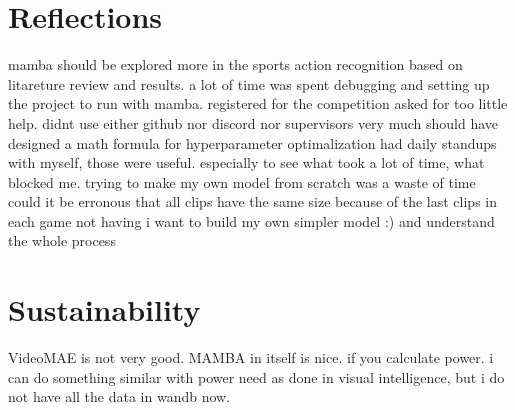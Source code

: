 \section{Reflections}
mamba should be explored more in the sports action recognition based on litareture review and results. 
a lot of time was spent debugging and setting up the project to run with mamba. 
registered for the competition
asked for too little help. didnt use either github nor discord nor supervisors very much
should have designed a math formula for hyperparameter optimalization
had daily standups with myself, those were useful. especially to see what took a lot of time, what blocked me.
trying to make my own model from scratch was a waste of time
could it be erronous that all clips have the same size because of the last clips in each game not having
i want to build my own simpler model :) and understand the whole process

\section{Sustainability}
VideoMAE is not very good. MAMBA in itself is nice. if you calculate power. i can do something similar with power need as done in visual intelligence, but i do not have all the data in wandb now. 